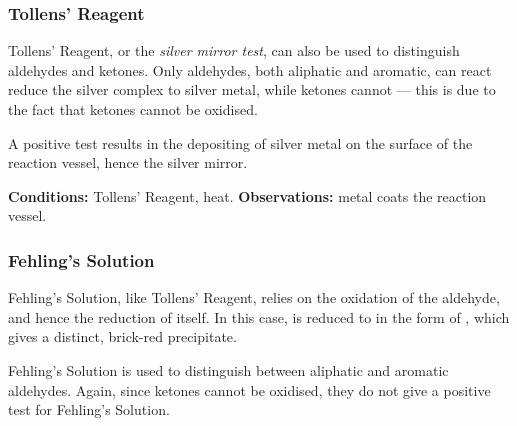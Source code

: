 			\subsubsection{Tollens' Reagent}

				Tollens' Reagent, or the \textit{silver mirror test}, can also be used to distinguish aldehydes and ketones. Only aldehydes,
				both aliphatic and aromatic, can react reduce the silver complex to silver metal, while ketones cannot –– this is due to the
				fact that ketones cannot be oxidised.

				A positive test results in the depositing of silver metal on the surface of the reaction vessel, hence the silver mirror.

				\vspace{1.5em}
				\vbox{\textbf{Conditions:}	\tabto{35mm}Tollens' Reagent, heat.}
				\vbox{\textbf{Observations:}\tabto{35mm} metal coats the reaction vessel.}





			\subsubsection{Fehling's Solution}

				Fehling's Solution, like Tollens' Reagent, relies on the oxidation of the aldehyde, and hence the reduction of itself. In
				this case,  is reduced to  in the form of , which gives a distinct, brick-red precipitate.

				Fehling's Solution is used to distinguish between aliphatic and aromatic aldehydes. Again, since ketones cannot be oxidised,
				they do not give a positive test for Fehling's Solution.


